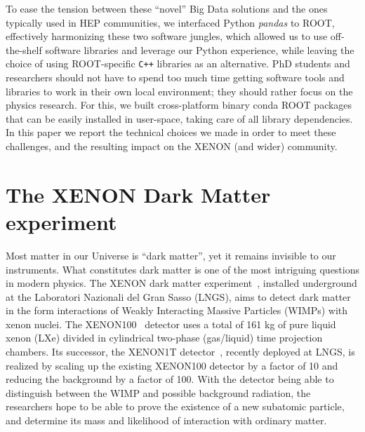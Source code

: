 \documentclass[a4paper]{jpconf}
\begin{document}
To ease the tension between these ``novel'' Big Data solutions and the ones typically used in HEP communities,
we interfaced Python \textit{pandas} to ROOT, effectively 
harmonizing these two software jungles, which allowed us to use off-the-shelf software libraries and leverage our Python experience, while 
leaving the choice of using ROOT-specific \texttt{C++} libraries as an alternative.
PhD students and researchers should not have to spend too much time getting software tools and libraries to work in their own local environment; they 
should rather focus on the physics research. For this, 
we built cross-platform binary conda ROOT packages that can be easily installed in user-space, taking care of all library dependencies.
In this paper we report the technical choices we made in order to meet these challenges, and the resulting impact on the XENON (and wider) community.

\section{The XENON Dark Matter experiment}
Most matter in our Universe is ``dark matter'', yet it remains invisible to our instruments. What
constitutes dark matter is one of the most intriguing questions in modern physics. 
The XENON dark matter experiment~\cite{Aprile2012573},
installed underground at the Laboratori Nazionali del Gran Sasso (LNGS),
aims to detect dark matter in the form interactions of Weakly 
Interacting Massive Particles (WIMPs) with xenon nuclei.
The XENON100~\cite{aprile2014analysis} detector uses a total of 161 kg of 
pure liquid xenon (LXe) divided in cylindrical two-phase  (gas/liquid)  time  projection  chambers.
Its successor, the XENON1T detector~\cite{aprile2013xenon1t}, recently deployed at LNGS, is 
realized by scaling up the existing XENON100 detector by a factor of 10 and reducing the background by a 
factor of 100. With the detector being able to distinguish between the WIMP and possible 
background radiation, the researchers hope to be able to prove the existence of a new subatomic 
particle, and determine its mass and likelihood of interaction with ordinary matter.
\end{document}
